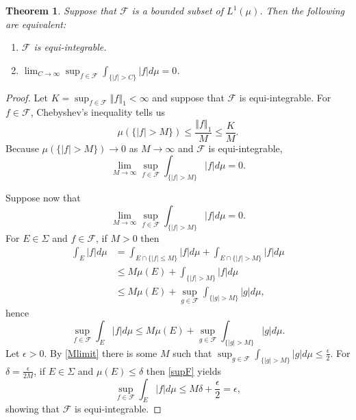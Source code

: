 \documentclass{article}
\newcommand{\norm}[1]{\left\Vert #1 \right\Vert}
\newtheorem{theorem}{Theorem}
\theoremstyle{definition}
\begin{document}
\begin{theorem}
Suppose that $\mathscr{F}$ is a bounded subset of $L^1(\mu)$. Then the following are equivalent:
\begin{enumerate}
\item $\mathscr{F}$ is equi-integrable.
\item $\lim_{C \to \infty} \sup_{f \in \mathscr{F}} \int_{\{|f|>C\}} |f| d\mu =0$.
\end{enumerate}
\label{TFAE}
\end{theorem}
\begin{proof}
Let $K=\sup_{f \in \mathscr{F}} \norm{f}_1<\infty$ and suppose that
$\mathscr{F}$ is equi-integrable. For $f \in \mathscr{F}$,
Chebyshev's inequality tells us
\[
\mu(\{|f|>M\}) \leq \frac{\norm{f}_1}{M} \leq \frac{K}{M}.
\] 
Because $\mu(\{|f|>M\}) \to 0$ as $M \to \infty$ and $\mathscr{F}$ is equi-integrable,
\[
\lim_{M \to \infty} \sup_{f \in \mathscr{F}} \int_{\{|f|>M\}} |f| d\mu  = 0.
\]

Suppose now that
\begin{equation}
\lim_{M \to \infty} \sup_{f \in \mathscr{F}} \int_{\{|f|>M\}} |f| d\mu =0.
\label{Mlimit}
\end{equation}
For $E \in \Sigma$ and $f \in \mathscr{F}$, if $M>0$ then
\begin{align*}
\int_E |f| d\mu&=\int_{E \cap \{|f| \leq M\}} |f| d\mu + \int_{E \cap \{|f|>M\}} |f| d\mu\\
&\leq M \mu(E) + \int_{\{|f|>M\}} |f| d\mu\\
&\leq M \mu(E) + \sup_{g \in \mathscr{F}} \int_{\{|g|>M\}} |g| d\mu,
\end{align*}
hence
\begin{equation}
\sup_{f \in \mathscr{F}} \int_E |f| d\mu \leq M \mu(E) + \sup_{g \in \mathscr{F}} \int_{\{|g|>M\}} |g| d\mu.
\label{supF}
\end{equation}
Let $\epsilon>0$.
By \eqref{Mlimit} there is some $M$ such that 
$\sup_{g \in \mathscr{F}} \int_{\{|g|>M\}} |g| d\mu \leq \frac{\epsilon}{2}$. 
For $\delta=\frac{\epsilon}{2M}$, if $E \in \Sigma$ and $\mu(E) \leq \delta$ then \eqref{supF} yields
\[
\sup_{f \in \mathscr{F}} \int_E |f| d\mu \leq M\delta +  \frac{\epsilon}{2}
= \epsilon,
\]
showing that $\mathscr{F}$ is equi-integrable.
\end{proof}
\end{document}
